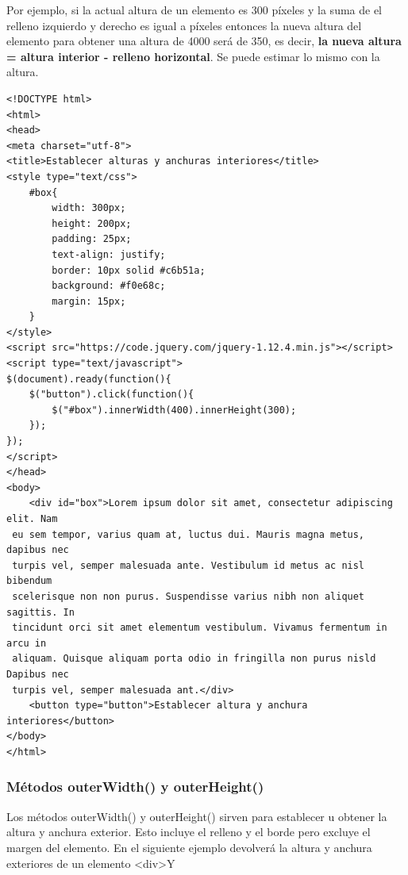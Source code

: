 \documentclass[a4paper, oneside]{article}
\begin{document}
Por ejemplo, si la actual altura de un elemento es 300 píxeles y la suma de el relleno izquierdo y derecho es igual a píxeles entonces la nueva altura del elemento para obtener una altura de 4000 será de 350, es decir, \textbf{la nueva altura = altura interior - relleno horizontal}. Se puede estimar lo mismo con la altura.

\begin{verbatim}
<!DOCTYPE html>
<html>
<head>
<meta charset="utf-8">
<title>Establecer alturas y anchuras interiores</title>
<style type="text/css">
    #box{
        width: 300px;
        height: 200px;
        padding: 25px;
        text-align: justify;
        border: 10px solid #c6b51a;
        background: #f0e68c;
        margin: 15px;
    }        
</style>
<script src="https://code.jquery.com/jquery-1.12.4.min.js"></script>
<script type="text/javascript">
$(document).ready(function(){
    $("button").click(function(){
        $("#box").innerWidth(400).innerHeight(300);
    });
});
</script>
</head>
<body>
    <div id="box">Lorem ipsum dolor sit amet, consectetur adipiscing elit. Nam
 eu sem tempor, varius quam at, luctus dui. Mauris magna metus, dapibus nec
 turpis vel, semper malesuada ante. Vestibulum id metus ac nisl bibendum
 scelerisque non non purus. Suspendisse varius nibh non aliquet sagittis. In
 tincidunt orci sit amet elementum vestibulum. Vivamus fermentum in arcu in
 aliquam. Quisque aliquam porta odio in fringilla non purus nisld Dapibus nec
 turpis vel, semper malesuada ant.</div>
    <button type="button">Establecer altura y anchura interiores</button>
</body>
</html>                                		

\end{verbatim}

\subsubsection{Métodos outerWidth() y outerHeight()}
\label{sec:org12536cf}

Los métodos outerWidth() y outerHeight() sirven para establecer u obtener la altura y anchura exterior. Esto incluye el relleno y el borde pero excluye el margen del elemento. En el siguiente ejemplo devolverá la altura y anchura exteriores de un elemento <div>Y
\end{document}
